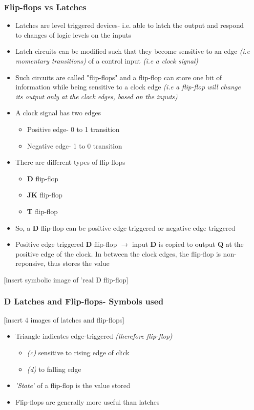 \documentclass{article}
\begin{document}
\subsubsection{Flip-flops vs Latches}
\begin{itemize}
\item Latches are level triggered devices- i.e. able to latch the output and respond to changes of logic levels on the inputs
\item Latch circuits can be modified such that they become sensitive to an edge \textit{(i.e momentary transitions)} of a control
input \textit{(i.e a clock signal)}
\item Such circuits are called "flip-flops" and a flip-flop can store one bit of information while being sensitive to a clock edge 
\textit{(i.e a flip-flop will change its output only at the clock edges, based on the inputs)}
\item A clock signal has two edges
\begin{itemize}
\item Positive edge- 0 to 1 transition
\item Negative edge- 1 to 0 transition
\end{itemize}
\item There are different types of flip-flops
\begin{itemize}
\item\textbf{D} flip-flop
\item \textbf{JK} flip-flop
\item \textbf{T} flip-flop
\end{itemize}
\item So, a \textbf{D} flip-flop can be positive edge triggered or negative edge triggered
\item Positive edge triggered \textbf{D} flip-flop $\rightarrow$ input \textbf{D} is copied to output \textbf{Q} at the positive edge of the clock. In between the clock edges, the flip-flop is non-reponsive, thus stores the value
\end{itemize}

[insert symbolic image of 'real D flip-flop]

\subsubsection{D Latches and Flip-flops- Symbols used}
[insert 4 images of latches and flip-flops]
\begin{itemize}
\item Triangle indicates edge-triggered \textit{(therefore flip-flop)}
\begin{itemize}
\item \textit{(c)} sensitive to rising edge of click
\item \textit{(d)} to falling edge
\end{itemize}
\item \textit{'State'} of a flip-flop is the value stored
\item Flip-flops are generally more useful than latches
\end{itemize} 
\end{document}
